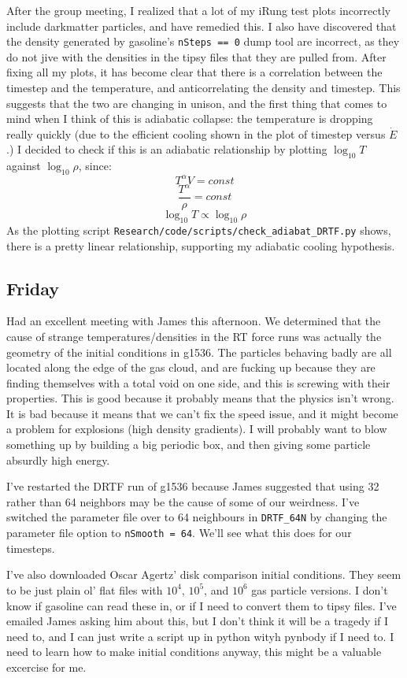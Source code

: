 \documentclass[11pt,letterpaper]{article}
\begin{document}
After the group meeting, I realized that a lot of my iRung test plots 
incorrectly include darkmatter particles, and have remedied this.  I also have
discovered that the density generated by gasoline's \verb!nSteps == 0! dump
tool are incorrect, as they do not jive with the densities in the tipsy files
that they are pulled from.  After fixing all my plots, it has become clear that
there is a correlation between the timestep and the temperature, and 
anticorrelating the density and timestep.  This suggests that the two are 
changing in unison, and the first thing that comes to mind when I think of this
is adiabatic collapse:  the temperature is dropping really quickly (due to the
efficient cooling shown in the plot of timestep versus $\dot E$.)  I decided
to check if this is an adiabatic relationship by plotting $\log_{10} T$ against
$\log_{10} \rho$, since:
$$T^\alpha V = const$$
$$\frac{T^\alpha}{\rho} = const $$
$$\log_{10} T \propto \log_{10}\rho$$
As the plotting script \verb!Research/code/scripts/check_adiabat_DRTF.py! shows,
there is a pretty linear relationship, supporting my adiabatic cooling 
hypothesis.
\subsection*{Friday}
Had an excellent meeting with James this afternoon.  We determined that the 
cause of strange temperatures/densities in the RT force runs was actually the
geometry of the initial conditions in g1536.  The particles behaving badly are
all located along the edge of the gas cloud, and are fucking up because they 
are finding themselves with a total void on one side, and this is screwing with
their properties.  This is good because it probably means that the physics 
isn't wrong.  It is bad because it means that we can't fix the speed issue, and
it might become a problem for explosions (high density gradients).  I will 
probably want to blow something up by building a big periodic box, and then 
giving some particle absurdly high energy.

I've restarted the DRTF run of g1536 because James suggested that using 32
rather than 64 neighbors may be the cause of some of our weirdness.  I've 
switched the parameter file over to 64 neighbours in \verb!DRTF_64N! by changing
the parameter file option to \verb!nSmooth = 64!.  We'll see what this does for
our timesteps.


I've also downloaded Oscar Agertz' disk comparison initial conditions.  They
seem to be just plain ol' flat files with $10^4$, $10^5$, and $10^6$ gas 
particle versions.  I don't know if gasoline can read these in, or if I need to 
convert them to tipsy files.  I've emailed James asking him about this, but I
don't think it will be a tragedy if I need to, and I can just write a script up
in python wityh pynbody if I need to.  I need to learn how to make initial 
conditions anyway, this might be a valuable excercise for me.
\end{document}

